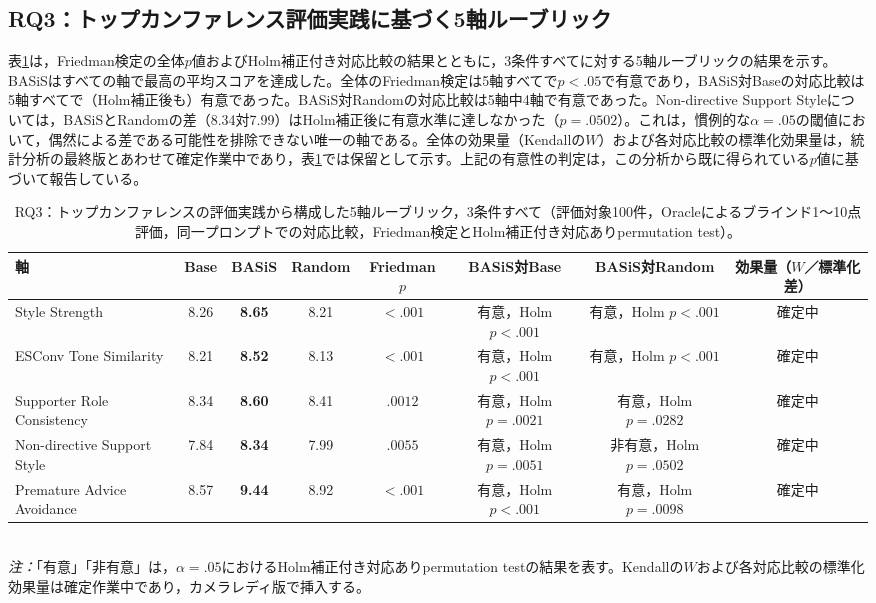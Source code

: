 \documentclass[manuscript,review,anonymous]{acmart}
\begin{document}
\subsection{RQ3：トップカンファレンス評価実践に基づく5軸ルーブリック}
表\ref{tab:five_axis}は，Friedman検定の全体$p$値およびHolm補正付き対応比較の結果とともに，3条件すべてに対する5軸ルーブリックの結果を示す。BASiSはすべての軸で最高の平均スコアを達成した。全体のFriedman検定は5軸すべてで$p<.05$で有意であり，BASiS対Baseの対応比較は5軸すべてで（Holm補正後も）有意であった。BASiS対Randomの対応比較は5軸中4軸で有意であった。Non-directive Support Styleについては，BASiSとRandomの差（8.34対7.99）はHolm補正後に有意水準に達しなかった（$p=.0502$）。これは，慣例的な$\alpha=.05$の閾値において，偶然による差である可能性を排除できない唯一の軸である。全体の効果量（Kendallの$W$）および各対応比較の標準化効果量は，統計分析の最終版とあわせて確定作業中であり，表\ref{tab:five_axis}では保留として示す。上記の有意性の判定は，この分析から既に得られている$p$値に基づいて報告している。

\begin{table}[t]
  \caption{RQ3：トップカンファレンスの評価実践から構成した5軸ルーブリック，3条件すべて（評価対象100件，Oracleによるブラインド1〜10点評価，同一プロンプトでの対応比較，Friedman検定とHolm補正付き対応ありpermutation test）。}
  \label{tab:five_axis}
  \footnotesize
  \begin{tabular}{lccccccc}
    \toprule
    軸 & Base & BASiS & Random & Friedman $p$ & BASiS対Base & BASiS対Random & 効果量（$W$／標準化差） \\
    \midrule
    Style Strength               & 8.26 & \textbf{8.65} & 8.21 & $<.001$  & 有意，Holm $p<.001$   & 有意，Holm $p<.001$   & 確定中 \\
    ESConv Tone Similarity       & 8.21 & \textbf{8.52} & 8.13 & $<.001$  & 有意，Holm $p<.001$   & 有意，Holm $p<.001$   & 確定中 \\
    Supporter Role Consistency   & 8.34 & \textbf{8.60} & 8.41 & $.0012$  & 有意，Holm $p=.0021$  & 有意，Holm $p=.0282$  & 確定中 \\
    Non-directive Support Style  & 7.84 & \textbf{8.34} & 7.99 & $.0055$  & 有意，Holm $p=.0051$  & 非有意，Holm $p=.0502$ & 確定中 \\
    Premature Advice Avoidance   & 8.57 & \textbf{9.44} & 8.92 & $<.001$  & 有意，Holm $p<.001$   & 有意，Holm $p=.0098$  & 確定中 \\
    \bottomrule
  \end{tabular}
  \\[2pt]
  {\footnotesize \emph{注：}「有意」「非有意」は，$\alpha=.05$におけるHolm補正付き対応ありpermutation testの結果を表す。Kendallの$W$および各対応比較の標準化効果量は確定作業中であり，カメラレディ版で挿入する。}
\end{table}
\end{document}
